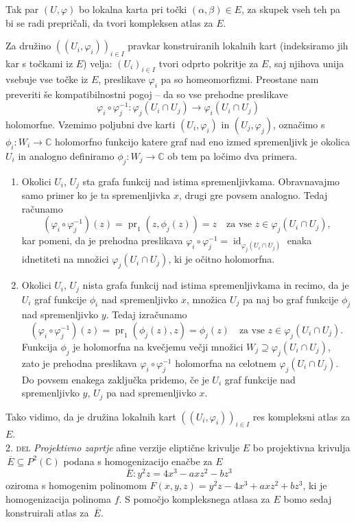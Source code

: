 \documentclass[mat1]{fmfdelo}
\newcommand{\C}{\mathbb C}
\newcommand{\PC}{P^2(\mathbb C)}
\newcommand{\inv}{^{-1}}
\newcommand{\olsi}[1]{\,\overline{\!{#1}}} %
\DeclareMathOperator{\id}{id}
\DeclareMathOperator{\pr}{pr}
\theoremstyle{definition}
\begin{document}
Tak par $(U, \varphi)$ bo lokalna karta pri točki $(\alpha, \beta) \in E$, za skupek vseh teh pa bi se radi prepričali, da tvori kompleksen atlas za $E$. 

Za družino $((U_i, \varphi_i))_{i \in I}$ pravkar konstruiranih lokalnih kart (indeksiramo jih kar s točkami iz $E$) velja: $(U_i)_{i \in I}$ tvori odprto pokritje za $E$, saj njihova unija vsebuje vse točke iz $E$, preslikave $\varphi_i$ pa so homeomorfizmi. Preostane nam preveriti še kompatibilnostni pogoj -- da so vse prehodne preslikave
\[
    \varphi_i \circ \varphi_j\inv : \varphi_j(U_i \cap U_j) \to \varphi_i(U_i \cap U_j)  
\]
holomorfne. Vzemimo poljubni dve karti $(U_i, \varphi_i)$ in $(U_j, \varphi_j)$, označimo s $\phi_i : W_i \to \C$ holomorfno funkcijo katere graf nad eno izmed spremenljivk je okolica $U_i$ in analogno definiramo $\phi_j : W_j \to \C$ ob tem pa ločimo dva primera. 
\begin{enumerate}
    \item Okolici $U_i$, $U_j$ sta grafa funkcij nad istima spremenljivkama. Obravnavajmo samo primer ko je ta spremenljivka $x$, drugi gre povsem analogno. Tedaj računamo
    \[
        (\varphi_i \circ \varphi_j\inv)(z) = \pr_1(z, \phi_j(z)) = z \quad \text{za vse $z \in \varphi_j(U_i \cap U_j)$,}
    \] 
    kar pomeni, da je prehodna preslikava $\varphi_i \circ \varphi_j\inv = \id_{\varphi_j(U_i \cap U_j)}$ enaka idnetiteti na množici $\varphi_j(U_i \cap U_j)$, ki je očitno holomorfna. 

    \item Okolici $U_i$, $U_j$ nista grafa funkcij nad istima spremenljivkama in recimo, da je $U_i$ graf funkcije $\phi_i$ nad spremenljivko $x$, množica $U_j$ pa naj bo graf funkcije $\phi_j$ nad spremenljivko $y$. Tedaj izračunamo
    \[
        (\varphi_i \circ \varphi_j\inv)(z) = \pr_1(\phi_j(z), z) = \phi_j(z) \quad \text{za vse $z \in \varphi_j(U_i \cap U_j)$.}   
    \]
    Funkcija $\phi_j$ je holomorfna na kvečjemu večji množici $W_j \supseteq \varphi_j(U_i \cap U_j)$, zato je prehodna preslikava $\varphi_i \circ \varphi_j\inv$ holomorfna na celotnem $\varphi_j(U_i \cap U_j)$. Do povsem enakega zaključka pridemo, če je $U_i$ graf funkcije nad spremenljivko $y$, $U_j$ pa nad spremenljivko $x$. 
\end{enumerate} 
Tako vidimo, da je družina lokalnih kart $((U_i, \varphi_i))_{i \in I}$ res kompleksni atlas za $E$. 
\\

\textsc{2. del} \emph{Projektivno zaprtje} afine verzije eliptične krivulje $E$ bo projektivna krivulja $\olsi{E} \subseteq \PC$ podana s homogenizacijo enačbe za $E$
\[
    \olsi{E} : y^2z = 4x^3 - axz^2 - bz^3  
\]
oziroma s homogenim polinomom $F(x,y,z) = y^2z - 4x^3 + axz^2 + bz^3$, ki je homogenizacija polinoma $f$. S pomočjo kompleksnega atlasa za $E$ bomo sedaj konstruirali atlas za $\olsi{E}$. 
\end{document}
